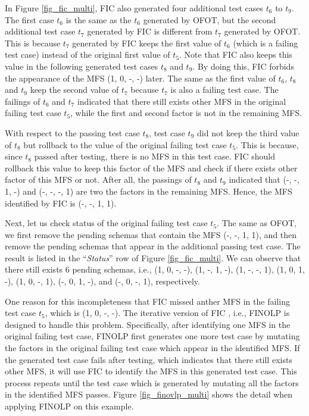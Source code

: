 In Figure \ref{fig_fic_multi}, FIC also generated four additional test cases $t_{6}$ to $t_{9}$. The first case $t_{6}$ is the same as the $t_{6}$ generated by OFOT, but the second additional test case $t_{7}$ generated by FIC is different from $t_{7}$ generated by OFOT. This is because $t_{7}$ generated by FIC keeps the first value of $t_{6}$ (which is a failing test case) instead of the original first value of $t_{5}$. Note that FIC also keeps this value in the following generated test cases $t_{8}$ and $t_{9}$. By doing this, FIC forbids the appearance of the MFS (1, 0, -, -) later. The same as the first value of $t_{6}$, $t_{8}$ and $t_{9}$ keep the second value of $t_{7}$ because $t_{7}$ is also a failing test case. The failings of $t_{6}$ and $t_{7}$ indicated that there still exists other MFS in the original failing test case $t_{5}$, while the first and second factor is not in the remaining MFS.

With respect to the passing test case $t_{8}$, test case $t_{9}$ did not keep the third value of $t_{8}$ but rollback to the value of the original failing test case $t_{5}$. This is because, since $t_{8}$ passed after testing, there is no MFS in this test case. FIC should rollback this value to keep this factor of the MFS and check if there exists other factor of this MFS or not. After all, the passings of $t_{8}$ and $t_{9}$ indicated that (-, -, 1, -) and (-, -, -, 1) are two the factors in the remaining MFS. Hence, the MFS identified by FIC is (-, -, 1, 1).

Next, let us check status of the original failing test case $t_{5}$. The same as OFOT, we first remove the pending schemas that contain the MFS (-, -, 1, 1), and then remove the pending schemas that appear in the additional passing test case. The result is listed in the ``\emph{Status}'' row of Figure \ref{fig_fic_multi}. We can observe that there still exists 6 pending schemas, i.e., (1, 0, -, -), (1, -, 1, -), (1, -, -, 1), (1, 0, 1, -), (1, 0, -, 1), (-, 0, 1, -), and (-, 0, -, 1), respectively.

One reason for this incompleteness that FIC missed anther MFS in the failing test case $t_{5}$, which is (1, 0, -, -). The iterative version of FIC \cite{zhang2011characterizing}, i.e., FINOLP is designed to handle this problem. Specifically, after identifying one MFS in the original failing test case,  FINOLP first generates one more test case by mutating the factors in the original failing test case which appear in the identified MFS. If the generated test case fails after testing, which indicates that there still exists other MFS, it will use FIC to identify the MFS in this generated test case. This process repeats until the test case which is generated by mutating all the factors in the identified MFS passes. Figure \ref{fig_finovlp_multi} shows the detail when applying FINOLP on this example.

